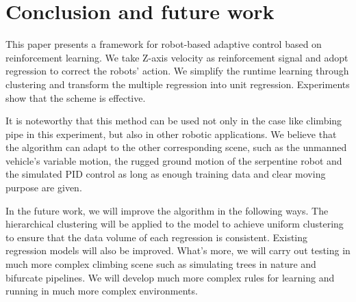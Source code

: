 \section{Conclusion and future work}
This paper presents a framework for robot-based adaptive control based on reinforcement learning. We take Z-axis velocity as reinforcement signal and adopt regression to correct the robots' action. We simplify the runtime learning through clustering and transform the multiple regression into unit regression. Experiments show that the scheme is effective.

It is noteworthy that this method can be used not only in the case like climbing pipe in this experiment, but also in other robotic applications. We believe that the algorithm can adapt to the other corresponding scene, such as the unmanned vehicle's variable motion, the rugged ground motion of the serpentine robot and the simulated PID control as long as enough training data and clear moving purpose are given.

In the future work, we will improve the algorithm in the following ways. The hierarchical clustering\cite{HierarchicalKmeans}\cite{HierarchicalClusterBased} will be applied to the model to achieve uniform clustering to ensure that the data volume of each regression is consistent. Existing regression models will also be improved. What's more, we will carry out testing in much more complex climbing scene such as simulating trees in nature and bifurcate pipelines. We will develop much more complex rules for learning and running in much more complex environments.
